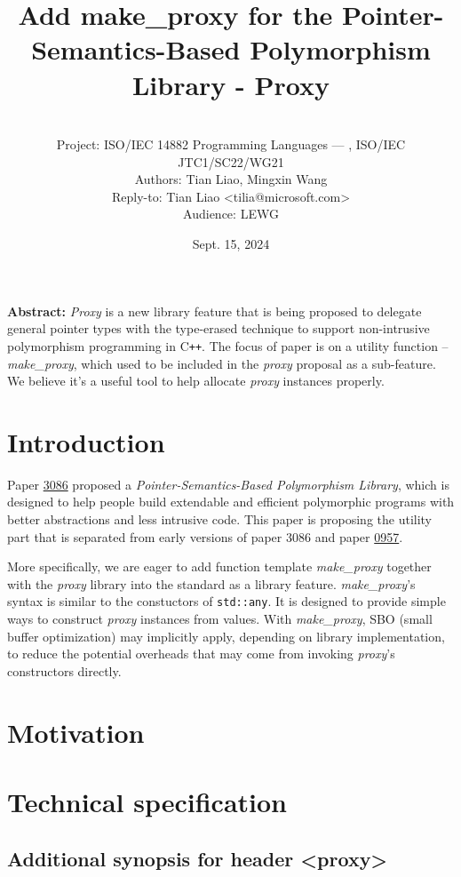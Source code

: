 \documentclass[10pt, a4paper, oneside]{article}
\title{Add make\_proxy for the Pointer-Semantics-Based
Polymorphism Library - Proxy}
\date{Sept. 15, 2024}
\author{%
\ \\
Project: ISO/IEC 14882 Programming Languages — \Cpp, ISO/IEC JTC1/SC22/WG21\\
Authors: Tian Liao, Mingxin Wang\\
Reply-to: Tian Liao \textless tilia@microsoft.com\textgreater \\
Audience: LEWG\\
}
\makeatletter
\newcommand{\Cpp}{C\texttt{++}}
\renewcommand{\maketitle}{\bgroup\setlength{\parindent}{0pt}
\begin{flushleft}
  \textbf{\huge \@title}

  \@author
\end{flushleft}\egroup
}
\makeatother
\begin{document}
\maketitle

\textbf{Abstract:} \textit{Proxy} is a new library feature that is being proposed to delegate general pointer types
with the type-erased technique to support non-intrusive polymorphism programming in \Cpp.
The focus of paper is on a utility function -- \textit{make\_proxy}, which used to be included in the \textit{proxy} proposal as a sub-feature.
We believe it's a useful tool to help allocate \textit{proxy} instances properly.

\section{Introduction}

Paper \href{https://wg21.link/p3086}{3086} proposed a \textit{Pointer-Semantics-Based Polymorphism Library},
which is designed to help people build extendable and efficient polymorphic programs with better abstractions and less intrusive code.
This paper is proposing the utility part that is separated from early versions of paper 3086 and paper \href{https://wg21.link/p0957}{0957}.

More specifically, we are eager to add function template \textit{make\_proxy} together with the \textit{proxy} library into the standard as a library feature.
\textit{make\_proxy}'s syntax is similar to the constuctors of \verb|std::any|. It is designed to provide simple ways to construct \textit{proxy} instances from values.
With \textit{make\_proxy}, SBO (small buffer optimization) may implicitly apply, depending on library implementation, to reduce the potential overheads that may come from invoking \textit{proxy}'s constructors directly.

\section{Motivation}
\lipsum[1]

\section{Technical specification}
\subsection{Additional synopsis for header \textless proxy\textgreater}
\end{document}
